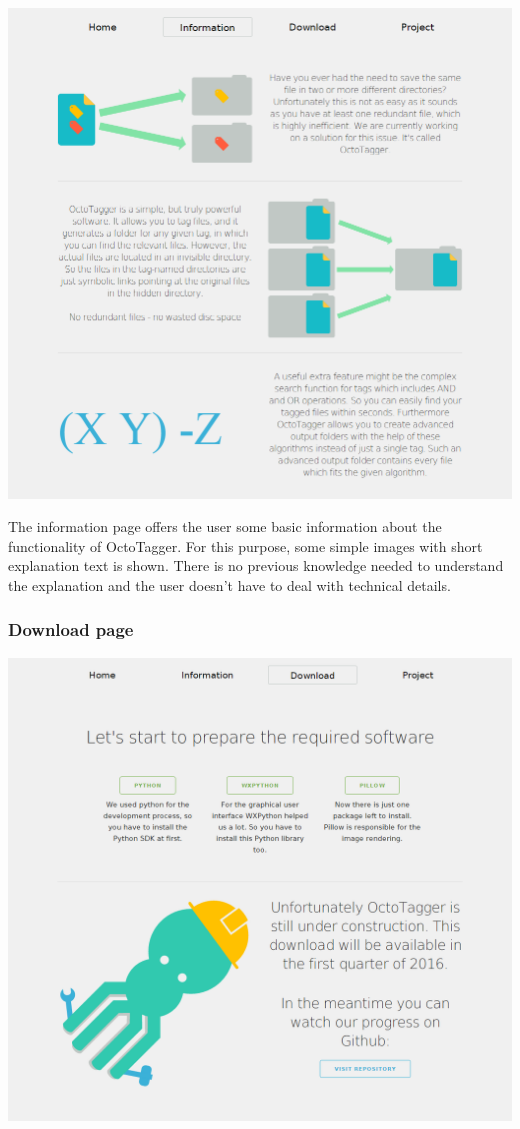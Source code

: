 \begin{center}
\includegraphics[scale=0.35]{images/information_full.png}
\end{center}

The information page offers the user some basic information about the functionality of OctoTagger. For this purpose, some simple images with short explanation text is shown. There is no previous knowledge needed to understand the explanation and the user doesn't have to deal with technical details.

\subsubsection{Download page}

\begin{center}
\includegraphics[scale=0.35]{images/download_full.png}
\end{center}

